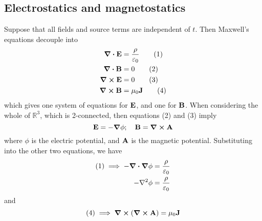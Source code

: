 \subsection{Electrostatics and magnetostatics}
Suppose that all fields and source terms are independent of \(t\).
Then Maxwell's equations decouple into
\begin{align}
	\div{\vb E}  & = \frac{\rho}{\varepsilon_0} \tag{1} \\
	\div{\vb B}  & = 0                          \tag{2} \\
	\curl{\vb E} & = 0                          \tag{3} \\
	\curl{\vb B} & = \mu_0 \vb J \tag{4}
\end{align}
which gives one system of equations for \(\vb E\), and one for \(\vb B\).
When considering the whole of \(\mathbb R^3\), which is 2-connected, then equations (2) and (3) imply
\[
	\vb E = -\grad \phi;\quad \vb B = \curl \vb A
\]
where \(\phi\) is the electric potential, and \(\vb A\) is the magnetic potential.
Substituting into the other two equations, we have
\begin{align*}
	(1) \implies -\div{\grad \phi} & = \frac{\rho}{\varepsilon_0} \\
	-\laplacian \phi               & = \frac{\rho}{\varepsilon_0}
\end{align*}
and
\[
	(4) \implies \curl(\curl{\vb A}) = \mu_0 \vb J
\]
